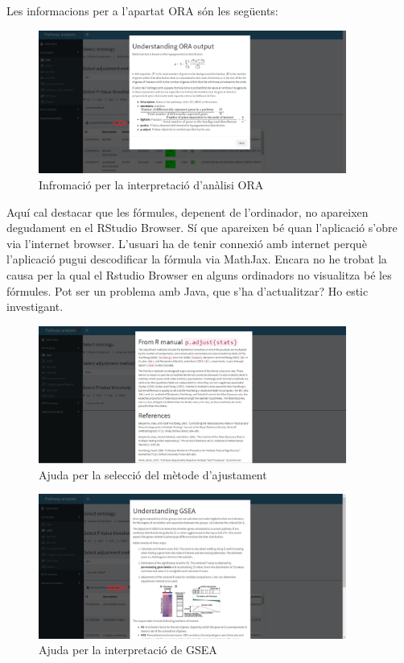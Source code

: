 Les informacions per a l'apartat \gls{ORA} són les següents:

\begin{figure}[H]
\centering
\includegraphics[width=0.9\textwidth]{figures/Help_ORA_output.jpg} 
\caption{Infromació per la interpretació d'anàlisi \gls{ORA}}
\end{figure}
Aquí cal destacar que les fórmules, depenent de l'ordinador, no apareixen degudament en el RStudio Browser. Sí que apareixen bé quan l'aplicació s'obre via l’internet browser. L'usuari ha de tenir connexió amb internet perquè l'aplicació pugui descodificar la fórmula via MathJax. Encara no he trobat la causa per la qual el Rstudio Browser en alguns ordinadors no visualitza bé les fórmules. Pot ser un problema amb Java, que s'ha d'actualitzar? Ho estic investigant.

\begin{figure}[H]
\centering
\includegraphics[width=0.9\textwidth]{figures/Help_pAdjustMethod.jpg} 
\caption{Ajuda per la selecció del mètode d'ajustament}
\end{figure}


\begin{figure}[H]
\centering
\includegraphics[width=0.9\textwidth]{figures/Help_GSEA_output.jpg} 
\caption{Ajuda per la interpretació de \gls{GSEA}}
\end{figure}



